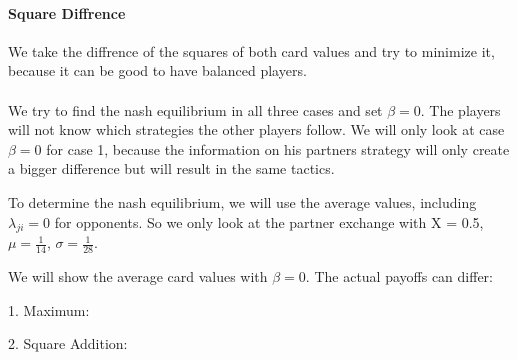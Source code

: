\paragraph{Square Diffrence} We take the diffrence of the squares of both card values and try to minimize it, because it can be good to have balanced players. 
\\
\\
We try to find the nash equilibrium in all three cases and set $\beta = 0$. The players will not know which strategies the other players follow. We will only look at case $\beta = 0$ for case 1, because the information on his partners strategy will only create a bigger difference but will result in the same tactics. 

To determine the nash equilibrium, we will use the average values, including $\lambda_{ji} = 0$ for opponents. So we only look at the partner exchange with X = 0.5, $\mu = \frac{1}{14}$, $\sigma = \frac{1}{28}$.

We will show the average card values with $\beta =0$. The actual payoffs can differ:
\begin{table}[h]
\end{table}

1. Maximum:
\begin{table}[h]
\end{table}

2. Square Addition:
\begin{table}[h]
\end{table}


